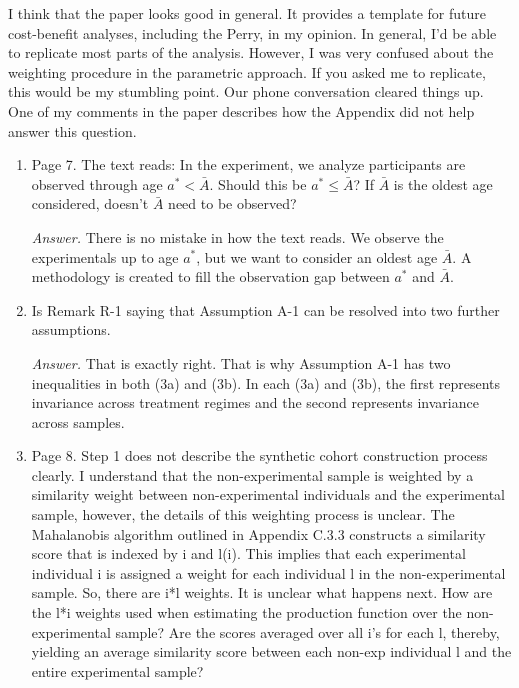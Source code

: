 I think that the paper looks good in general. It provides a template for future cost-benefit analyses, including the Perry, in my opinion. In general, I'd be able to replicate most parts of the analysis. However, I was very confused about the weighting procedure in the parametric approach. If you asked me to replicate, this would be my stumbling point. Our phone conversation cleared things up. One of my comments in the paper describes how the Appendix did not help answer this question. 

\begin{enumerate}

\item Page 7. The text reads: In the experiment, we analyze participants are observed through age $a^* < \bar{A}$. Should this be $a^* \leq \bar{A}$? If $\bar{A}$ is the oldest age considered, doesn't $\bar{A}$ need to be observed?

\noindent \textit{Answer.} There is no mistake in how the text reads. We observe the experimentals up to age $a^*$, but we want to consider an oldest age $\bar{A}$. A methodology is created to fill the observation gap between $a^*$ and $\bar{A}$.

\item Is Remark R-1 saying that Assumption A-1 can be resolved into two further assumptions.

\noindent \textit{Answer.} That is exactly right. That is why Assumption A-1 has two inequalities in both (3a) and (3b). In each (3a) and (3b), the first represents invariance across treatment regimes and the second represents invariance across samples.

\item Page 8. Step 1 does not describe the synthetic cohort construction process clearly. I understand that the non-experimental sample is weighted by a similarity weight between non-experimental individuals and the experimental sample, however, the details of this weighting process is unclear. The Mahalanobis algorithm outlined in Appendix C.3.3 constructs a similarity score that is indexed by i and l(i). This implies that each experimental individual i is assigned a weight for each individual l in the non-experimental sample. So, there are i*l weights. It is unclear what happens next. How are the l*i weights used when estimating the production function over the non-experimental sample? Are the scores averaged over all i's for each l, thereby, yielding an average similarity score between each non-exp individual l and the entire experimental sample?


\end{enumerate}
